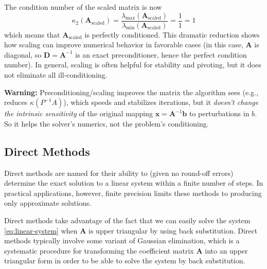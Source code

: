 \begin{exampleBox}
    The condition number of the scaled matrix is now
    \begin{equation*}
        \kappa_2(\mathbf{A}_{\text{scaled}}) = \frac{\lambda_{\text{max}}(\mathbf{A}_{\text{scaled}})}{\lambda_{\text{min}}(\mathbf{A}_{\text{scaled}})} = \frac{1}{1} = 1
    \end{equation*}
    which means that $\mathbf{A}_{\text{scaled}}$ is perfectly conditioned. This dramatic reduction shows how scaling can improve numerical behavior in favorable cases (in this case, $\mathbf{A}$ is diagonal, so $\mathbf{D} = \mathbf{A}^{-1}$ is an exact preconditioner, hence the perfect condition number). In general, scaling is often helpful for stability and pivoting, but it does not eliminate all ill-conditioning.
\end{exampleBox}

\begin{warningBox}
    \textbf{Warning:} Preconditioning/scaling improves the matrix the algorithm sees (e.g., reduces $\kappa(P^{-1}A)$), which speeds and stabilizes iterations, but it \emph{doesn't change the intrinsic sensitivity} of the original mapping $\mathbf{x}=\mathbf{A}^{-1}\mathbf{b}$ to perturbations in $b$. So it helps the solver's numerics, not the problem's conditioning.
\end{warningBox}


\subsection{Direct Methods}
Direct methods are named for their ability to (given no round-off errors) determine the exact solution to a linear system within a finite number of steps. In practical applications, however, finite precision limits these methods to producing only approximate solutions.

Direct methods take advantage of the fact that we can easily solve the system \autoref{eq:linear-system} when $ \mathbf{A} $ is upper triangular by using back substitution. Direct methods typically involve some variant of Gaussian elimination, which is a systematic procedure for transforming the coefficient matrix $ \mathbf{A} $ into an upper triangular form in order to be able to solve the system by back substitution. 

